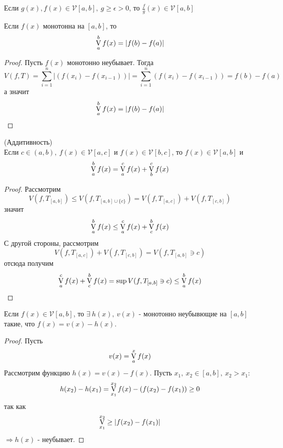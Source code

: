 \begin{consequense}
    Если $g(x), f(x)\in \mathcal{V}[a,b],\ g\geq \epsilon>0$, то $\frac{f}{g}(x)\in \mathcal{V}[a,b]$
\end{consequense} 
\begin{numtheorem}
    Если $f(x)$ монотонна на $[a,b]$, то
    \[\operatorname*{V}\limits_{a}^{b} f(x)=|f(b)- f(a)|\]
\end{numtheorem}
\begin{proof}
    Пусть $f(x)$ монотонно неубывает. Тогда
    \[V(f,T)=\sum\limits_{i=1}^{n}|(f(x_i)-f(x_{i-1}))|=\sum\limits_{i=1}^{n}(f(x_i)-f(x_{i-1}))=f(b)-f(a)\]
    а значит
    \[\operatorname*{V}\limits_{a}^{b}f(x)=|f(b)-f(a)|\]
\end{proof} 
\begin{numtheorem} (Аддитивность)\\
    Если $c\in (a,b),\ f(x)\in \mathcal{V}[a,c]$ и $f(x)\in \mathcal{V}[b,c]$, то $f(x)\in \mathcal{V}[a,b]$ и 
    \[\operatorname*{V}\limits_{a}^{b}f(x)=\operatorname*{V}\limits_{a}^{c}f(x)+\operatorname*{V}\limits_{b}^{c}f(x)\]
\end{numtheorem} 
\begin{proof}
    Рассмотрим 
    \[V(f,T_{[a,b]})\leq V(f, T_{[a,b]\cup \{c\}})=V(f, T_{[a,c]})+V(f,T_{[c,b]})\]
    значит
    \[\operatorname*{V}\limits_{a}^{b} f(x)\leq \operatorname*{V}\limits_{a}^{c} f(x)+\operatorname*{V}\limits_{c}^{b} f(x)\]
    С другой стороны, рассмотрим 
    \[V(f, T_{[a,c]})+V(f, T_{[c,b]})=V(f, T_{[a,b]}\ni c)\]
    отсюда получим
    \[\operatorname*{V}\limits_{a}^{c}f(x)+\operatorname*{V}\limits_{c}^{b}f(x)=\sup V(f,T_{[a,b]}\ni c)\leq \operatorname*{V}\limits_{a}^{b} f(x)\] 
\end{proof} 
\setcounter{thmcount}{0}
\begin{theorem}
    Если $f(x)\in \mathcal{V}[a,b]$, то $\exists\ h(x),\ v(x)$ - монотонно неубывющие на $[a,b]$ такие, что $f(x)=v(x)-h(x)$.
\end{theorem} 
\begin{proof}
    Пусть
    \[v(x)=\operatorname*{V}\limits_{a}^{x} f(x)\]
    Рассмотрим функцию $h(x)=v(x)-f(x)$. Пусть $x_1,\ x_2\in [a,b],\ x_2>x_1$:
    \[h(x_2)-h(x_1)=\operatorname*{V}\limits_{x_1}^{x_2}f(x)-(f(x_2)-f(x_1))\geq 0\]
    так как 
    \[\operatorname*{V}\limits_{x_1}^{x_2}\geq|f(x_2)-f(x_1)|\]
    $\Rightarrow h(x)$ - неубывает.
\end{proof} 
